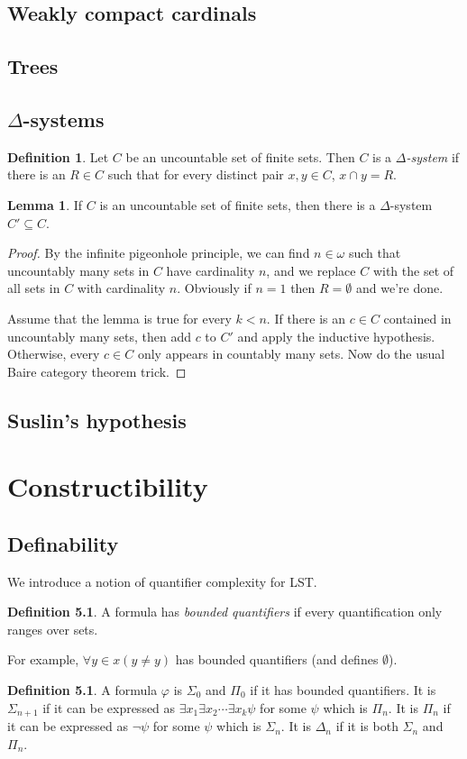 \documentclass[12pt]{report}
\newcommand{\dfn}[1]{\emph{#1}\index{#1}}
\theoremstyle{definition}
\newtheorem{lemma}[theorem]{Lemma}
\newtheorem{definition}[theorem]{Definition}
\begin{document}
\section{Weakly compact cardinals}
\section{Trees}
\section{$\Delta$-systems}

\begin{definition}
    Let $C$ be an uncountable set of finite sets. Then $C$ is a \dfn{$\Delta$-system} if there is an $R \in C$ such that for every distinct pair $x, y \in C$, $x \cap y = R$.
\end{definition}
\begin{lemma}
    If $C$ is an uncountable set of finite sets, then there is a $\Delta$-system $C' \subseteq C$.
\end{lemma}
\begin{proof}
    By the infinite pigeonhole principle, we can find $n \in \omega$ such that uncountably many sets in $C$ have cardinality $n$, and we replace $C$ with the set of all sets in $C$ with cardinality $n$. Obviously if $n = 1$ then $R = \emptyset$ and we're done.

    Assume that the lemma is true for every $k < n$. If there is an $c \in C$ contained in uncountably many sets, then add $c$ to $C'$ and apply the inductive hypothesis. Otherwise, every $c \in C$ only appears in countably many sets. Now do the usual Baire category theorem trick.
\end{proof}
\section{Suslin's hypothesis}





\chapter{Constructibility}
\section{Definability}
We introduce a notion of quantifier complexity for LST.
\begin{definition}
A formula has \dfn{bounded quantifiers} if every quantification only ranges over sets.
\end{definition}
For example, $\forall y \in x(y \neq y)$ has bounded quantifiers (and defines $\emptyset$).
\begin{definition}
A formula $\varphi$ is $\Sigma_0$ and $\Pi_0$ if it has bounded quantifiers. It is $\Sigma_{n+1}$ if it can be expressed as $\exists x_1 \exists x_2 \cdots \exists x_k \psi$ for some $\psi$ which is $\Pi_n$. It is $\Pi_n$ if it can be expressed as $\neg\psi$ for some $\psi$ which is $\Sigma_n$. It is $\Delta_n$ if it is both $\Sigma_n$ and $\Pi_n$.
\end{definition}
\end{document}
